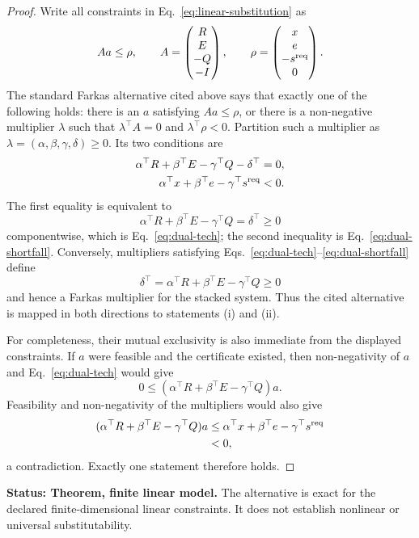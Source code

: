\documentclass[11pt]{article}
\theoremstyle{definition}
\newcommand{\status}[1]{\par\smallskip\noindent\textbf{Status: #1.}\quad}
\begin{document}
\begin{proof}
Write all constraints in Eq.~\eqref{eq:linear-substitution} as
\[
Aa\le \rho,
\qquad
A=\begin{pmatrix}R\\E\\-Q\\-I\end{pmatrix},
\qquad
\rho=\begin{pmatrix}x\\e\\-s^{\rm req}\\0\end{pmatrix}.
\]
The standard Farkas alternative cited above says that exactly one of the following holds: there is an $a$ satisfying $Aa\le \rho$, or there is a non-negative multiplier $\lambda$ such that $\lambda^\top A=0$ and $\lambda^\top\rho<0$. Partition such a multiplier as $\lambda=(\alpha,\beta,\gamma,\delta)\ge0$. Its two conditions are
\begin{align*}
\alpha^\top R+\beta^\top E-\gamma^\top Q-\delta^\top&=0,\\
\alpha^\top x+\beta^\top e-\gamma^\top s^{\rm req}&<0.
\end{align*}
The first equality is equivalent to
\[
\alpha^\top R+\beta^\top E-\gamma^\top Q
=\delta^\top\ge0
\]
componentwise, which is Eq.~\eqref{eq:dual-tech}; the second inequality is Eq.~\eqref{eq:dual-shortfall}. Conversely, multipliers satisfying Eqs.~\eqref{eq:dual-tech}--\eqref{eq:dual-shortfall} define
\[
\delta^\top=\alpha^\top R+\beta^\top E-\gamma^\top Q\ge0
\]
and hence a Farkas multiplier for the stacked system. Thus the cited alternative is mapped in both directions to statements (i) and (ii).

For completeness, their mutual exclusivity is also immediate from the displayed constraints. If $a$ were feasible and the certificate existed, then non-negativity of $a$ and Eq.~\eqref{eq:dual-tech} would give
\[
0\le(\alpha^\top R+\beta^\top E-\gamma^\top Q)a.
\]
Feasibility and non-negativity of the multipliers would also give
\begin{align*}
(\alpha^\top R+\beta^\top E-\gamma^\top Q)a
&\le\alpha^\top x+\beta^\top e-\gamma^\top s^{\rm req}\\
&<0,
\end{align*}
a contradiction. Exactly one statement therefore holds.
\end{proof}

\status{Theorem, finite linear model} The alternative is exact for the declared finite-dimensional linear constraints. It does not establish nonlinear or universal substitutability.
\end{document}
